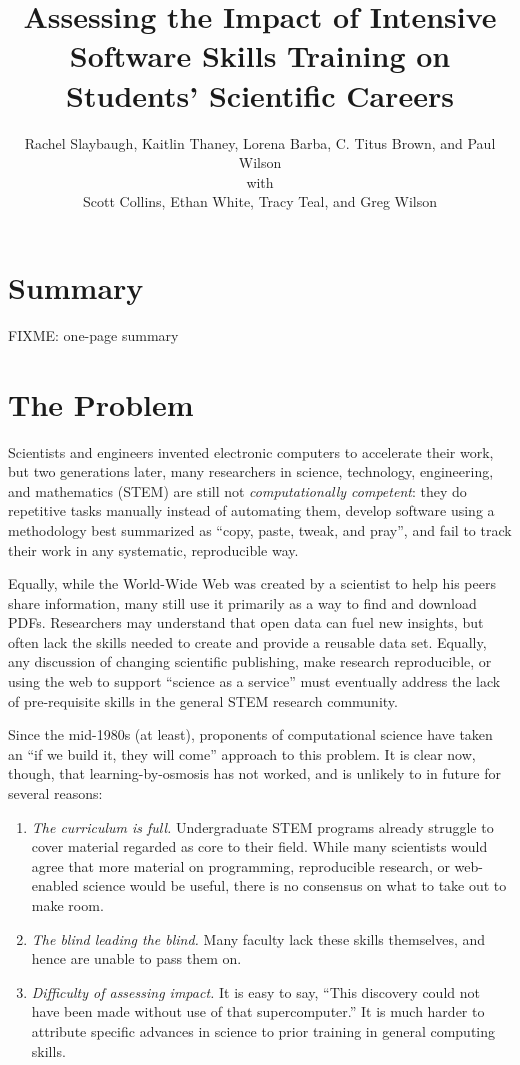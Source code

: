 \documentclass[11pt]{article}
\title{
  Assessing the Impact of Intensive Software Skills Training
  on Students' Scientific Careers
}
\author{
  Rachel Slaybaugh, Kaitlin Thaney, Lorena Barba, C. Titus Brown, and Paul Wilson\\
  with\\
  Scott Collins, Ethan White, Tracy Teal, and Greg Wilson
}
\begin{document}
\maketitle
\pagebreak

\section{Summary}

FIXME: one-page summary

\pagebreak

\section{The Problem}

Scientists and engineers invented electronic computers to accelerate
their work, but two generations later, many researchers in science,
technology, engineering, and mathematics (STEM) are still not
\emph{computationally competent}: they do repetitive tasks manually
instead of automating them, develop software using a methodology best
summarized as ``copy, paste, tweak, and pray'', and fail to track
their work in any systematic, reproducible way.

Equally, while the World-Wide Web was created by a scientist to help
his peers share information, many still use it primarily as a way to
find and download PDFs.  Researchers may understand that open data can
fuel new insights, but often lack the skills needed to create and
provide a reusable data set.  Equally, any discussion of changing
scientific publishing, make research reproducible, or using the web to
support ``science as a service'' must eventually address the lack of
pre-requisite skills in the general STEM research community.

Since the mid-1980s (at least), proponents of computational science
have taken an ``if we build it, they will come'' approach to this
problem.  It is clear now, though, that learning-by-osmosis has not
worked, and is unlikely to in future for several reasons:

\begin{enumerate}

\item
  \emph{The curriculum is full.}  Undergraduate STEM programs already
  struggle to cover material regarded as core to their field.  While
  many scientists would agree that more material on programming,
  reproducible research, or web-enabled science would be useful, there
  is no consensus on what to take out to make room.

\item
  \emph{The blind leading the blind.}  Many faculty lack these skills
  themselves, and hence are unable to pass them on.

\item
  \emph{Difficulty of assessing impact.} It is easy to say, ``This
  discovery could not have been made without use of that
  supercomputer.''  It is much harder to attribute specific advances
  in science to prior training in general computing skills.

\end{enumerate}
\end{document}
